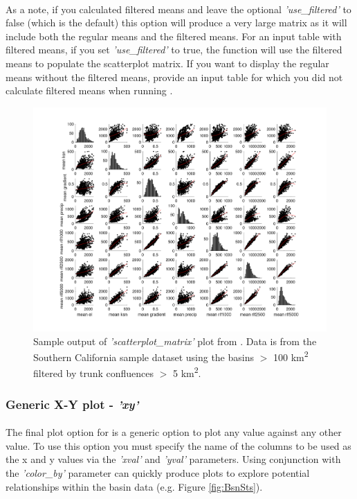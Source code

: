 \paragraph{}As a note, if you calculated filtered means and leave the optional \textit{'use\_filtered'} to false (which is the default) this option will produce a very large matrix as it will include both the regular means and the filtered means. For an input table with filtered means, if you set \textit{'use\_filtered'} to true, the function will use the filtered means to populate the scatterplot matrix. If you want to display the regular means without the filtered means, provide an input table for which you did not calculate filtered means when running .

\begin{figure}[H]
	\centering
	\includegraphics[width=16.5cm]{PNGs/ScatterPlotMatrix.png}
	\caption{Sample output of \textit{'scatterplot\_matrix'} plot from . Data is from the Southern California sample dataset using the basins $>$ 100 km\textsuperscript{2}  filtered by trunk confluences $>$ 5 km\textsuperscript{2}.}
	\label{fig:ScatterMatrix}
\end{figure}

\subsubsection{Generic X-Y plot - \textit{'xy'}} \label{sec:xy}
\paragraph{}The final plot option for  is a generic option to plot any value against any other value. To use this option you must specify the name of the columns to be used as the x and y values via the \textit{'xval'} and \textit{'yval'} parameters. Using conjunction with the \textit{'color\_by'} parameter can quickly produce plots to explore potential relationships within the basin data (e.g. Figure \ref{fig:BsnSts}).


